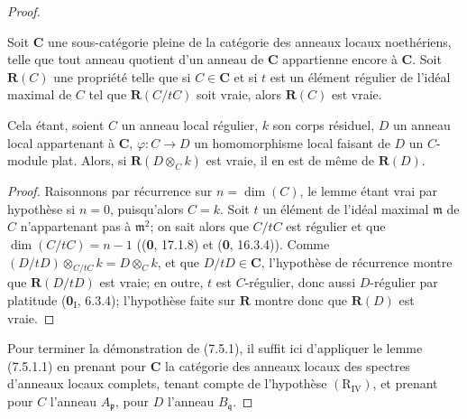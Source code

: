 \begin{proof}

\begin{lemma}[7.5.1.1]
\label{IV.2.s7.5.1.1-fr}
Soit $\boldsymbol{C}$ une sous-catégorie pleine de la catégorie des anneaux
locaux noethériens, telle que tout anneau quotient d'un anneau de
$\boldsymbol{C}$ appartienne encore à $\boldsymbol{C}$. Soit $\boldsymbol R(C)$ une
propriété telle que si $C\in\boldsymbol{C}$ et si $t$ est un élément régulier de
l'idéal maximal de $C$ tel que $\boldsymbol R(C/tC)$ soit vraie, alors
$\boldsymbol R(C)$ est vraie.

Cela étant, soient $C$ un anneau local régulier, $k$ son corps résiduel,
$D$ un anneau local appartenant à $\boldsymbol{C}$,
$\varphi:C\to D$ un homomorphisme local faisant de $D$ un $C$-module plat.
Alors, si $\boldsymbol R(D\otimes_C k)$ est vraie, il en est de même de
$\boldsymbol R(D)$.
\end{lemma}

\begin{proof}
Raisonnons par récurrence sur $n=\dim(C)$, le lemme étant vrai par hypothèse
si $n=0$, puisqu'alors $C=k$. Soit $t$ un élément de l'idéal maximal
$\mathfrak m$ de $C$ n'appartenant pas à $\mathfrak m^2$; on sait alors que
$C/tC$ est régulier et que $\dim(C/tC)=n-1$ ((\textbf{0}, 17.1.8) et (\textbf{0}, 16.3.4)).
Comme $(D/tD)\otimes_{C/tC}k=D\otimes_C k$, et que $D/tD\in\boldsymbol{C}$, l'hypothèse de récurrence montre que
$\boldsymbol R(D/tD)$ est vraie; en outre, $t$ est $C$-régulier, donc aussi
$D$-régulier par platitude (\textbf{0}$_{\mathrm I}$, 6.3.4); l'hypothèse faite sur
$\boldsymbol R$ montre donc que $\boldsymbol R(D)$ est vraie.
\end{proof}

Pour terminer la démonstration de (7.5.1), il suffit ici d'appliquer le
lemme (7.5.1.1) en prenant pour $\boldsymbol{C}$ la catégorie des anneaux locaux
des spectres d'anneaux locaux complets, tenant compte de l'hypothèse
$(\mathrm R_{\mathrm{IV}})$, et prenant pour $C$ l'anneau
$A_{\mathfrak p}$, pour $D$ l'anneau $B_{\mathfrak q}$.
\end{proof}

